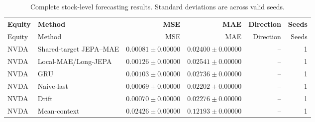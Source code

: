 \begin{longtable}{llrrrr}
\caption{Complete stock-level forecasting results. Standard deviations are across valid seeds.}\label{tab:appendix_stock_metrics}\\
\toprule
Equity & Method & MSE & MAE & Direction & Seeds \\
\midrule
\endfirsthead
\toprule
Equity & Method & MSE & MAE & Direction & Seeds \\
\midrule
\endhead
NVDA & Shared-target JEPA--MAE & $0.00081 \pm 0.00000$ & $0.02400 \pm 0.00000$ & -- & 1 \\
NVDA & Local-MAE/Long-JEPA & $0.00126 \pm 0.00000$ & $0.02541 \pm 0.00000$ & -- & 1 \\
NVDA & GRU & $0.00103 \pm 0.00000$ & $0.02736 \pm 0.00000$ & -- & 1 \\
NVDA & Naive-last & $0.00069 \pm 0.00000$ & $0.02202 \pm 0.00000$ & -- & 1 \\
NVDA & Drift & $0.00070 \pm 0.00000$ & $0.02276 \pm 0.00000$ & -- & 1 \\
NVDA & Mean-context & $0.02426 \pm 0.00000$ & $0.12193 \pm 0.00000$ & -- & 1 \\
\bottomrule
\end{longtable}

